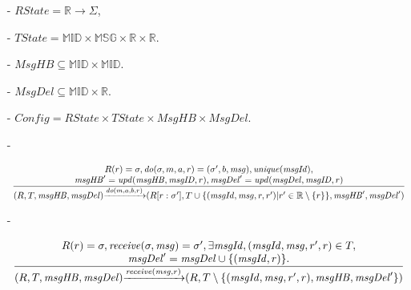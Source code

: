 \begin{itemize}
\setlength{\itemsep}{0.5pt}
\item[-] $\mathit{RState} = \mathbb{R} \rightarrow \Sigma$,

\item[-] $\mathit{TState} = \mathbb{MID} \times \mathbb{MSG} \times \mathbb{R} \times \mathbb{R}$. 

\item[-] $\mathit{MsgHB} \subseteq \mathbb{MID} \times \mathbb{MID}$. 

\item[-] $\mathit{MsgDel}\subseteq \mathbb{MID} \times \mathbb{R}$. 

\item[-] $\mathit{Config} = \mathit{RState} \times \mathit{TState} \times \mathit{MsgHB} \times \mathit{MsgDel}$. 

\item[-]

$\begin{array}{l c}
   \bigfrac{
   \begin{array}{c}
     R(r) = \sigma, \mathit{do}(\sigma,m,a,r) = (\sigma',b,\mathit{msg}), \mathit{unique}(\mathit{msgId}), \\ 
     \mathit{msgHB}' = \mathit{upd}(\mathit{msgHB},\mathit{msgID},r) ,\mathit{msgDel}' = \mathit{upd}(\mathit{msgDel},\mathit{msgID},r) 
   \end{array}}
     {(R,T,\mathit{msgHB},\mathit{msgDel}) {\xrightarrow{\mathit{do}(m,a,b,r)}} (R[r:\sigma'],T \cup \{ (\mathit{msgId},\mathit{msg},r,r') \vert r' \in \mathbb{R} \setminus \{ r \} \}, \mathit{msgHB}',\mathit{msgDel}')}
\end{array}$

\item[-] 

$\begin{array}{l c}
   \bigfrac{
   \begin{array}{c}
      R(r) = \sigma, \mathit{receive}(\sigma,\mathit{msg}) = \sigma', \exists \mathit{msgId},(\mathit{msgId},\mathit{msg},r',r) \in T, \\ 
      \mathit{msgDel}' = \mathit{msgDel} \cup \{ (\mathit{msgId},r) \}. 
   \end{array}}
     {(R,T,\mathit{msgHB},\mathit{msgDel}) {\xrightarrow{\mathit{receive}(\mathit{msg},r)}} (R,T \setminus \{ (\mathit{msgId},\mathit{msg},r',r),\mathit{msgHB},\mathit{msgDel}' \} )}
\end{array}$
\end{itemize} 

